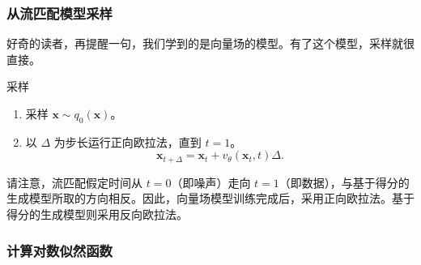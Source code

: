 \subsubsection{从流匹配模型采样}

好奇的读者，再提醒一句，我们学到的是向量场的模型。有了这个模型，采样就很直接。
\begin{booknote}[colframe=blue!65!black,colback=blue!4]{采样}
  \begin{enumerate}
    \item 采样 $\mathbf x\sim q_0(\mathbf x)$。
    \item 以 $\Delta$ 为步长运行正向欧拉法，直到 $t=1$。
    \[
      \mathbf x_{t+\Delta}=\mathbf x_t+v_\theta(\mathbf x_t,t)\Delta.
    \]
  \end{enumerate}
\end{booknote}
请注意，流匹配假定时间从 $t=0$（即噪声）走向 $t=1$（即数据），与基于得分的生成模型所取的方向相反。因此，向量场模型训练完成后，采用正向欧拉法。基于得分的生成模型则采用反向欧拉法。

\subsubsection{计算对数似然函数}

